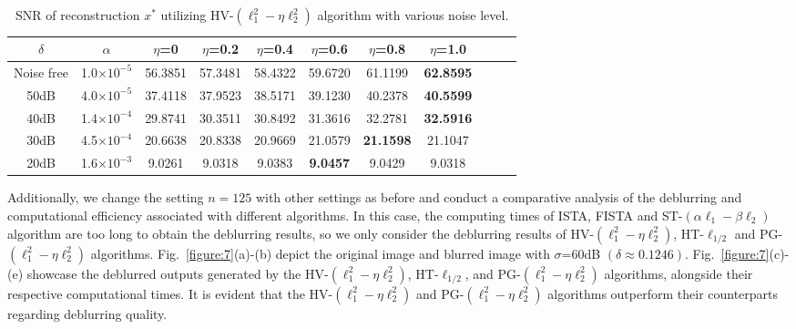 \documentclass[a4paper,12pt]{article}
\numberwithin{equation}{section}
\begin{document}
\begin{table}[H]
\caption{{\rm SNR} of reconstruction $x^{*}$  utilizing HV-$\left(\ell_{1}^{2}-\eta\ell_{2}^{2}\right)$ algorithm with various noise level.}
\label{table:4}
\centering
\tabcolsep=0.35cm
\linewidth
\begin{tabular}{ccccccccccc}
\hline
$\delta$ & $\alpha$ & \multicolumn{1}{c}{$\eta$=0} & \multicolumn{1}{c}{$\eta$=0.2} & \multicolumn{1}{c}{$\eta$=0.4} & \multicolumn{1}{c}{$\eta$=0.6} & \multicolumn{1}{c}{$\eta$=0.8} & \multicolumn{1}{c}{$\eta$=1.0} \\
\hline
Noise free & 1.0$\times 10^{-5}$ & 56.3851 & 57.3481 & 58.4322 & 59.6720 & 61.1199 & \textbf{62.8595} \\
50dB & 4.0$\times 10^{-5}$ & 37.4118 & 37.9523 & 38.5171 & 39.1230 & 40.2378 & \textbf{40.5599} \\
40dB & 1.4$\times 10^{-4}$ & 29.8741  & 30.3511 & 30.8492 & 31.3616 & 32.2781 & \textbf{32.5916} \\
30dB & 4.5$\times 10^{-4}$ & 20.6638 & 20.8338 & 20.9669 & 21.0579 & \textbf{21.1598} & 21.1047 \\
20dB & 1.6$\times 10^{-3}$ & 9.0261 & 9.0318 & 9.0383 & \textbf{9.0457} & 9.0429 & 9.0318 \\
\hline
\end{tabular}
\end{table}

\par Additionally, we change the setting $n=125$ with other settings as before and conduct a comparative analysis of the deblurring and computational efficiency associated with different algorithms. In this case, the computing times of ISTA, FISTA and ST-$\left(\alpha\ell_{1}-\beta\ell_{2}\right)$ algorithm are too long to obtain the deblurring results, so we only consider the deblurring results of HV-$\left(\ell_{1}^{2}-\eta\ell_{2}^{2}\right)$, HT-$\ell_{1/2}$ and PG-$\left(\ell_{1}^{2}-\eta\ell_{2}^{2}\right)$ algorithms. Fig.\ \ref{figure:7}(a)-(b) depict the original image and blurred image with $\sigma$=60dB $(\delta\approx 0.1246)$. Fig.\ \ref{figure:7}(c)-(e) showcase the deblurred outputs generated by the HV-$\left(\ell_{1}^{2}-\eta\ell_{2}^{2}\right)$, HT-$\ell_{1/2}$, and PG-$\left(\ell_{1}^{2}-\eta\ell_{2}^{2}\right)$ algorithms, alongside their respective computational times. It is evident that the HV-$\left(\ell_{1}^{2}-\eta\ell_{2}^{2}\right)$ and PG-$\left(\ell_{1}^{2}-\eta\ell_{2}^{2}\right)$ algorithms outperform their counterparts regarding deblurring quality.
\end{document}
